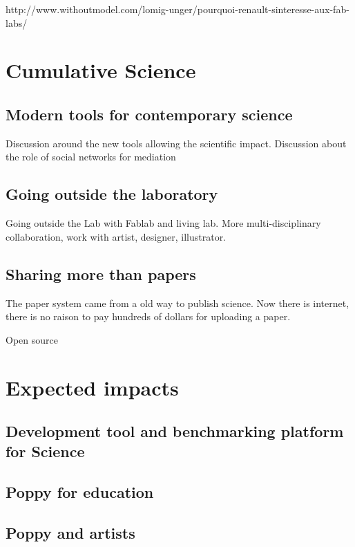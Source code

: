 http://www.withoutmodel.com/lomig-unger/pourquoi-renault-sinteresse-aux-fab-labs/

\section{Cumulative Science} %

\subsection{Modern tools for contemporary science} %

Discussion around the new tools allowing the scientific impact.
Discussion about the role of social networks for mediation

\subsection{Going outside the laboratory} %
Going outside the Lab with Fablab and living lab.
More multi-disciplinary collaboration, work with artist, designer, illustrator.


\subsection{Sharing more than papers} %

The paper system came from a old way to publish science. Now there is internet, there is no raison to pay hundreds of dollars for uploading a paper.

Open source


\section{Expected impacts} %

\subsection{Development tool and benchmarking platform for Science} %

\subsection{Poppy for education} %

\subsection{Poppy and artists} %


